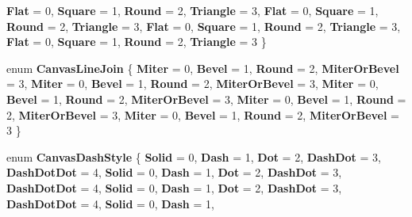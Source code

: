 \begin{DoxyCompactItemize}
{\bfseries Flat} = 0, 
{\bfseries Square} = 1, 
{\bfseries Round} = 2, 
{\bfseries Triangle} = 3, 
\newline
{\bfseries Flat} = 0, 
{\bfseries Square} = 1, 
{\bfseries Round} = 2, 
{\bfseries Triangle} = 3, 
\newline
{\bfseries Flat} = 0, 
{\bfseries Square} = 1, 
{\bfseries Round} = 2, 
{\bfseries Triangle} = 3, 
\newline
{\bfseries Flat} = 0, 
{\bfseries Square} = 1, 
{\bfseries Round} = 2, 
{\bfseries Triangle} = 3
 \}
\item 
\mbox{\label{namespace_microsoft_1_1_graphics_1_1_canvas_1_1_geometry_a962f9c8c901a160f4a74f2be716840d7}} 
enum {\bfseries Canvas\+Line\+Join} \{ \newline
{\bfseries Miter} = 0, 
{\bfseries Bevel} = 1, 
{\bfseries Round} = 2, 
{\bfseries Miter\+Or\+Bevel} = 3, 
\newline
{\bfseries Miter} = 0, 
{\bfseries Bevel} = 1, 
{\bfseries Round} = 2, 
{\bfseries Miter\+Or\+Bevel} = 3, 
\newline
{\bfseries Miter} = 0, 
{\bfseries Bevel} = 1, 
{\bfseries Round} = 2, 
{\bfseries Miter\+Or\+Bevel} = 3, 
\newline
{\bfseries Miter} = 0, 
{\bfseries Bevel} = 1, 
{\bfseries Round} = 2, 
{\bfseries Miter\+Or\+Bevel} = 3, 
\newline
{\bfseries Miter} = 0, 
{\bfseries Bevel} = 1, 
{\bfseries Round} = 2, 
{\bfseries Miter\+Or\+Bevel} = 3
 \}
\item 
\mbox{\label{namespace_microsoft_1_1_graphics_1_1_canvas_1_1_geometry_ab285a1e0da5c91c32bbb2fbbec7ad1c0}} 
enum {\bfseries Canvas\+Dash\+Style} \{ \newline
{\bfseries Solid} = 0, 
{\bfseries Dash} = 1, 
{\bfseries Dot} = 2, 
{\bfseries Dash\+Dot} = 3, 
\newline
{\bfseries Dash\+Dot\+Dot} = 4, 
{\bfseries Solid} = 0, 
{\bfseries Dash} = 1, 
{\bfseries Dot} = 2, 
\newline
{\bfseries Dash\+Dot} = 3, 
{\bfseries Dash\+Dot\+Dot} = 4, 
{\bfseries Solid} = 0, 
{\bfseries Dash} = 1, 
\newline
{\bfseries Dot} = 2, 
{\bfseries Dash\+Dot} = 3, 
{\bfseries Dash\+Dot\+Dot} = 4, 
{\bfseries Solid} = 0, 
\newline
{\bfseries Dash} = 1, 

\end{DoxyCompactItemize}
